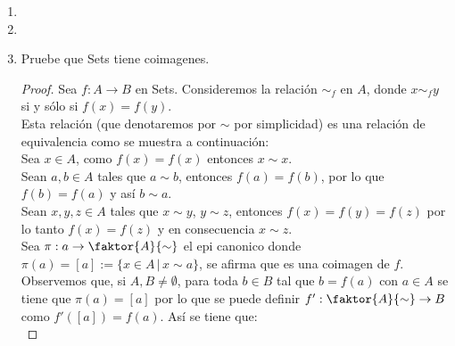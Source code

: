 \documentclass{article}
\begin{document}
\begin{enumerate}[label=\textbf{Ej \arabic*.}]
\begin{proof}
Entonces, por la propiedad universal de la unión existe $\theta: \displaystyle \bigcup_{i\in I}A_i\longrightarrow B$ tal que $\alpha\mu=Id\theta=\theta$.
Análogamente se tiene que existe $\theta': \displaystyle \bigcup_{i\in I}A_i\longrightarrow B$ tal que $\beta\mu=Id\theta'=\theta'$, y como $\mathscr{C}$ 
tiene igualadores entonces existe $\gamma:X\to  \displaystyle \bigcup_{i\in I}A_i$ tal que $\mu_i=\eta\mu_i'$.\\

Por lo que $ \displaystyle \bigcup_{i\in I}A_i$





\end{proof}




\item 

\item

\item Pruebe que Sets tiene coimagenes.

\begin{proof}
Sea $f:A\to B$ en Sets. Consideremos la relación $\sim_f$ en $A$, donde $x\sim_f y$ si y sólo si $f(x)=f(y)$.\\

Esta relación (que denotaremos por $\sim$ por simplicidad) es una relación de equivalencia como se muestra a continuación:\\

\quad Sea $x\in A$, como $f(x)=f(x)$ entonces $x\sim x$.\\

\quad Sean $a,b\in A$ tales que $a\sim b$, entonces $f(a)=f(b)$, por lo que $f(b)=f(a)$ y así $b\sim a$.\\

\quad Sean $x,y,z\in A$ tales que $x\sim y$, $y\sim z$, entonces $f(x)=f(y)=f(z)$ por lo tanto $f(x)=f(z)$ y en consecuencia
$x\sim z$.\\

Sea $\pi:a\to \faktor{A}{\sim}$ el epi canonico donde $\pi(a)=[a]:=\{x\in A\,|\,x\sim a\}$, se afirma que es una coimagen de $f$.\\

Observemos que, si $A,B\neq \emptyset$, para toda $b\in B$ tal que $b=f(a)$ con $a\in A$ se tiene que $\pi(a)=[a]$ por lo que se puede definir 
$f': \faktor{A}{\sim}\to B$ como $f'([a])=f(a)$. Así se tiene que:\\


\end{proof}
\end{enumerate}
\end{document}
